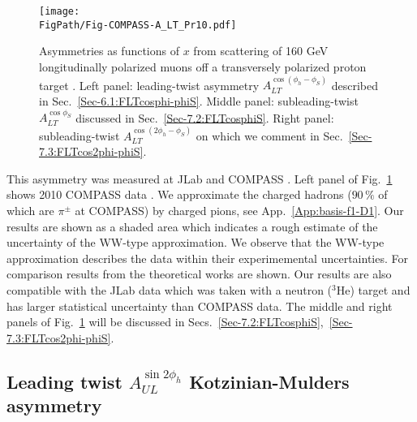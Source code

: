 \documentclass[a4paper,11pt]{article}
\newcommand*{\FigPath}{./figs}%
\begin{document}
\begin{figure}[b!]
\centering
\texttt{[image: \\FigPath/Fig-COMPASS-A\_LT\_Pr10.pdf]}
	\caption{\label{g1t_jlab} 
	Asymmetries as functions of $x$ from scattering of 160 GeV
	longitudinally polarized muons off a transversely polarized 
	proton target \cite{Parsamyan:2015dfa}.
	Left panel: 
	leading-twist asymmetry $A_{LT}^{\cos(\phi_h-\phi_S)}$ 
	described in Sec.~\ref{Sec-6.1:FLTcosphi-phiS}.
	Middle panel: 
	subleading-twist $A_{LT}^{\cos\phi_S}$ 
	discussed in Sec.~\ref{Sec-7.2:FLTcosphiS}.
	Right panel: 
	subleading-twist $A_{LT}^{\cos(2\phi_h-\phi_S)}$
	on which we comment in Sec.~\ref{Sec-7.3:FLTcos2phi-phiS}.}
\end{figure}

This asymmetry was measured at JLab and COMPASS 
\cite{Huang:2011bc,Parsamyan:2015dfa}. Left panel of Fig.~\ref{g1t_jlab} 
shows 2010 COMPASS data \cite{Parsamyan:2015dfa}. We approximate the 
charged hadrons ($90\,\%$ of which are $\pi^\pm$ at COMPASS) by 
charged pions, see App.~\ref{App:basis-f1-D1}.
Our results are shown as a shaded area which indicates a rough estimate
of the uncertainty of the WW-type approximation.
We observe that the WW-type approximation describes the data within 
their experimemental uncertainties.
For comparison results from the theoretical works 
\cite{Kotzinian:2006dw,Kotzinian:2008fe,Boffi:2009sh} are shown.
Our results are also compatible with the JLab data which was 
taken with a neutron ($^3$He) target \cite{Huang:2011bc} and has 
larger statistical uncertainty than COMPASS data. The middle and right 
panels of Fig.~\ref{g1t_jlab} will be discussed in 
Secs.~\ref{Sec-7.2:FLTcosphiS},~\ref{Sec-7.3:FLTcos2phi-phiS}.



\newpage

\subsection{\boldmath 
	Leading twist $A_{UL}^{\sin2\phi_h}$ Kotzinian-Mulders  asymmetry}
	\label{Sec-6.2:FULsin2phi}
\end{document}
